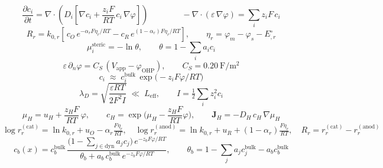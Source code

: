 \documentclass[12pt]{article}
\newcommand{\Jbf}{\mathbf{J}}
\newcommand{\Eeq}{E^{\circ}}
\begin{document}
\Large
\[ \frac{\partial c_i}{\partial t} = \nabla\!\cdot\!\left(D_i\!\left[\nabla c_i + \frac{z_i F}{RT}\,c_i\,\nabla\varphi\right]\right) \qquad\qquad -\nabla\!\cdot(\varepsilon\,\nabla\varphi) = \sum_i z_i F\,c_i \]
\clearpage
\[ R_r = k_{0,r}\!\left[\,c_O\,e^{-\alpha_r F\eta_r/RT} - c_R\,e^{(1-\alpha_r)F\eta_r/RT}\right], \qquad \eta_r = \varphi_m - \varphi_s - \Eeq_{,r} \]
\clearpage
\[ \mu_i^{\mathrm{steric}} = -\ln\theta, \qquad \theta = 1 - \sum_i a_i c_i \]
\clearpage
\[ \varepsilon\,\partial_n\varphi = C_S\,(V_{\mathrm{app}} - \varphi_{\mathrm{OHP}}), \qquad C_S = 0.20~\mathrm{F/m^2} \]
\clearpage
\[ c_i \;\approx\; c_i^{\mathrm{bulk}}\,\exp\!\big(-z_i F\varphi/RT\big) \]
\clearpage
\[ \lambda_D = \sqrt{\frac{\varepsilon RT}{2F^2 I}} \;\ll\; L_{\mathrm{eff}}, \qquad I = \tfrac12\sum_i z_i^2 c_i \]
\clearpage
\[ \mu_H = u_H + \frac{z_H F}{RT}\,\varphi, \qquad c_H = \exp\!\Big(\mu_H - \frac{z_H F}{RT}\varphi\Big), \qquad \Jbf_H = -D_H\,c_H\,\nabla\mu_H \]
\clearpage
\[ \log r_r^{(\mathrm{cat})} = \ln k_{0,r} + u_O - \alpha_r\tfrac{F\eta_r}{RT}, \quad \log r_r^{(\mathrm{anod})} = \ln k_{0,r} + u_R + (1-\alpha_r)\tfrac{F\eta_r}{RT}, \quad R_r = r_r^{(\mathrm{cat})} - r_r^{(\mathrm{anod})} \]
\clearpage
\[ c_b(x) = c_b^{\mathrm{bulk}}\,\frac{\big(1 - \sum_{j\in\mathrm{dyn}} a_j c_j\big)\,e^{-z_b F\varphi/RT}}{\theta_b + a_b\,c_b^{\mathrm{bulk}}\,e^{-z_b F\varphi/RT}}, \qquad \theta_b = 1 - \sum_j a_j c_j^{\mathrm{bulk}} - a_b c_b^{\mathrm{bulk}} \]
\end{document}
